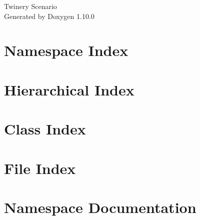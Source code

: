 \documentclass[twoside]{book}
\newcommand{\+}{\discretionary{\mbox{\scriptsize$\hookleftarrow$}}{}{}}
\newcommand{\clearemptydoublepage}{%
    \newpage{\pagestyle{empty}\cleardoublepage}%
  }
\begin{document}
  \raggedbottom
    \hypersetup{pageanchor=false,
                bookmarksnumbered=true,
                pdfencoding=unicode
               }
  \begin{titlepage}
  \vspace*{7cm}
  \begin{center}%
  {\Large Twinery Scenario}\\
  \vspace*{1cm}
  {\large Generated by Doxygen 1.10.0}\\
  \end{center}
  \end{titlepage}
  \clearemptydoublepage
  \tableofcontents
  \clearemptydoublepage
  \hypersetup{pageanchor=true}

\chapter{Namespace Index}

\chapter{Hierarchical Index}

\chapter{Class Index}

\chapter{File Index}

\chapter{Namespace Documentation}













\end{document}

